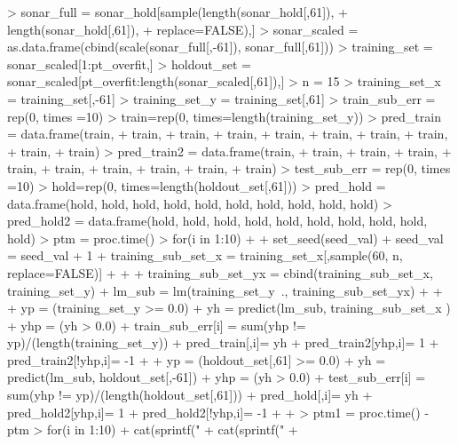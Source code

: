 \documentclass{article}
\begin{document}
\begin{Schunk}
\begin{Sinput}
> sonar_full = sonar_hold[sample(length(sonar_hold[,61]), 
+                                length(sonar_hold[,61]), 
+                                replace=FALSE),]
> sonar_scaled = as.data.frame(cbind(scale(sonar_full[,-61]), sonar_full[,61]))
> training_set =  sonar_scaled[1:pt_overfit,]
> holdout_set = sonar_scaled[pt_overfit:length(sonar_scaled[,61]),]
> n = 15
> training_set_x = training_set[,-61]
> training_set_y = training_set[,61]
> train_sub_err = rep(0, times =10)
> train=rep(0, times=length(training_set_y))
> pred_train = data.frame(train, 
+                         train, 
+                         train, 
+                         train, 
+                         train, 
+                         train, 
+                         train, 
+                         train, 
+                         train, 
+                         train) 
> pred_train2 = data.frame(train, 
+                          train, 
+                          train, 
+                          train, 
+                          train, 
+                          train, 
+                          train, 
+                          train, 
+                          train, 
+                          train) 
> test_sub_err = rep(0, times =10)
> hold=rep(0, times=length(holdout_set[,61]))
> pred_hold = data.frame(hold, hold, hold, hold, hold, hold, hold, hold, hold, hold) 
> pred_hold2 = data.frame(hold, hold, hold, hold, hold, hold, hold, hold, hold, hold) 
> ptm = proc.time()
> for(i in 1:10){
+   
+   set_seed(seed_val)
+   seed_val = seed_val + 1
+   training_sub_set_x = training_set_x[,sample(60, n, replace=FALSE)]
+   
+   
+   training_sub_set_yx = cbind(training_sub_set_x, training_set_y)
+   lm_sub = lm(training_set_y~., training_sub_set_yx)
+   
+   
+   yp = (training_set_y >= 0.0)
+   yh = predict(lm_sub, training_sub_set_x )
+   yhp = (yh > 0.0)
+   train_sub_err[i] = sum(yhp != yp)/(length(training_set_y))
+   pred_train[,i]= yh
+   pred_train2[yhp,i]= 1
+   pred_train2[!yhp,i]= -1
+   
+   yp = (holdout_set[,61] >= 0.0)
+   yh = predict(lm_sub, holdout_set[,-61])
+   yhp = (yh > 0.0)
+   test_sub_err[i] = sum(yhp != yp)/(length(holdout_set[,61]))
+   pred_hold[,i]= yh
+   pred_hold2[yhp,i]= 1
+   pred_hold2[!yhp,i]= -1
+   
+ }
> ptm1 = proc.time() - ptm
> for(i in 1:10){
+   cat(sprintf("%dth %d attributes traning error: %f", i, n, train_sub_err[i]), "\n")
+   cat(sprintf("%dth %d attributes test error: %f", i, n, test_sub_err[i]), "\n")
+ }

\end{Sinput}
\end{Schunk}
\end{document}
